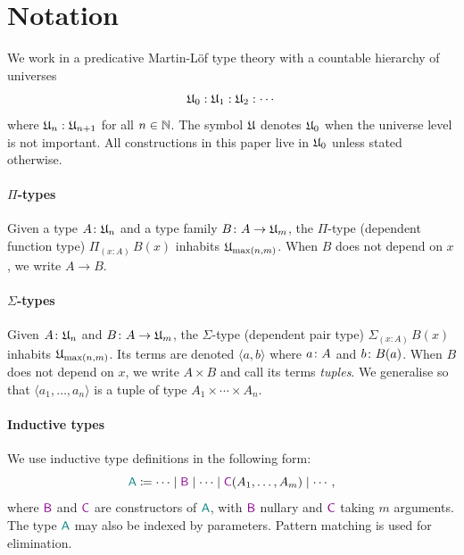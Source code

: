 \documentclass[
  a4paper,        %
  techreport,     %
]{art}
\begin{document}
\section{Notation}\label{sec:type-theory}

We work in a predicative Martin-L\"of type theory with a countable hierarchy of
universes
\begin{equation*}
  \mathfrak{U}_{0} : \mathfrak{U}_{1} : \mathfrak{U}_{2} : \cdots
\end{equation*}
where $\mathfrak{U}_{n} : \mathfrak{U}_{n+1}$ for all $n \in \mathbb{N}$. The symbol $\mathfrak{U}$ denotes
$\mathfrak{U}_{0}$ when the universe level is not important. All constructions in this
paper live in $\mathfrak{U}_{0}$ unless stated otherwise.

\paragraph{$\Pi$-types}
Given a type $A\colon\mathfrak{U}_{n}$ and a type family
$B\colon A \to \mathfrak{U}_{m}$, the $\Pi$-type (dependent function type)
$\Pi_{(x : A)}\, B(x)$ inhabits $\mathfrak{U}_{\max(n,m)}$. When $B$ does not depend on
$x$, we write $A \to B$.

\paragraph{$\Sigma$-types}
Given $A\colon\mathfrak{U}_{n}$ and $B\colon A \to \mathfrak{U}_{m}$, the $\Sigma$-type
(dependent pair type) $\Sigma_{(x : A)}\, B(x)$ inhabits $\mathfrak{U}_{\max(n,m)}$. Its
terms are denoted $\langle a, b \rangle$ where $a\colon A$ and
$b\colon B(a)$. When $B$ does not depend on $x$, we write $A \times B$ and
call its terms \emph{tuples}. We generalise so that
$\langle a_1, \dots, a_n \rangle$ is a tuple of type
$A_1 \times \cdots \times A_n$.

\paragraph{Inductive types}
We use inductive type definitions in the following form:
\begin{equation}\label{eq:inductive-type-definition}
  \typedef{
    \ctype{A}
  }{
    \cdots \mid \ccon{B} \mid \cdots \mid \ccon{C}(A_1, \dots, A_m) \mid \cdots
  }\,,
\end{equation}
where $\ccon{B}$ and $\ccon{C}$ are constructors of ${\color{teal}\mathsf{A}}$, with
$\ccon{B}$ nullary and $\ccon{C}$ taking $m$ arguments. The type ${\color{teal}\mathsf{A}}$
may also be indexed by parameters. Pattern matching is used for elimination.
\end{document}
